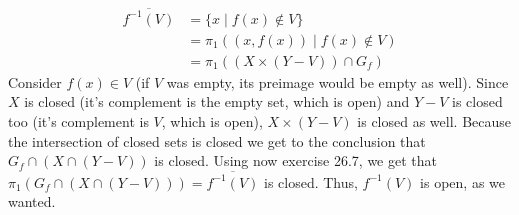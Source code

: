 \documentclass{article}
\begin{document}
    \begin{align*}
        \overline{f^{-1}(V)} &= \{x \mid f(x) \notin V\} \\
        &= \pi_1((x, f(x)) \mid f(x) \notin V) \\
        &= \pi_1((X \times (Y - V)) \cap G_f)
    \end{align*}
    Consider $f(x) \in V$ (if $V$ was empty, its preimage would be empty as well). Since $X$ is closed (it's complement is the empty set, which is open) and $Y - V$ is closed too (it's complement is $V$, which is open), $X \times (Y - V)$ is closed as well. Because the intersection of closed sets is closed we get to the conclusion that $G_f \cap (X \cap (Y - V))$ is closed. Using now exercise 26.7, we get that $\pi_1(G_f \cap (X \cap (Y - V))) = \overline{f^{-1}(V)}$ is closed. Thus, $f^{-1}(V)$ is open, as we wanted. 
\end{document}
